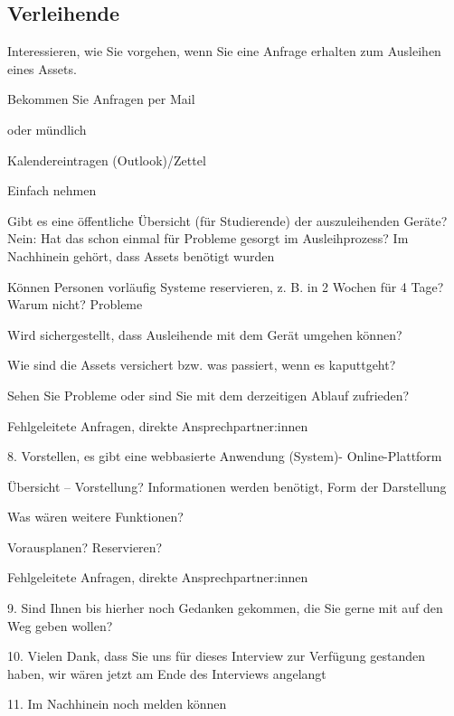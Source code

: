 \subsection{Verleihende}
{\sffamily\color{maincolor}{Abschnitt: Jetzt}}
\begin{compactenum}
    \item Interessieren, wie Sie vorgehen, wenn Sie eine Anfrage erhalten zum Ausleihen eines
          Assets.
          \begin{compactenum}
              \item Bekommen Sie Anfragen per Mail
              \item oder mündlich
              \item Kalendereintragen (Outlook)/Zettel
              \item Einfach nehmen
          \end{compactenum}
    \item Gibt es eine öffentliche Übersicht (für Studierende) der auszuleihenden Geräte? Nein: Hat
          das schon einmal für Probleme gesorgt im Ausleihprozess? Im Nachhinein gehört, dass Assets
          benötigt wurden
    \item Können Personen vorläufig Systeme reservieren, z. B. in 2 Wochen für 4 Tage?
          Warum nicht? Probleme
    \item Wird sichergestellt, dass Ausleihende mit dem Gerät umgehen können?
    \item Wie sind die Assets versichert bzw. was passiert, wenn es kaputtgeht?
    \item Sehen Sie Probleme oder sind Sie mit dem derzeitigen Ablauf zufrieden?
    \item Fehlgeleitete Anfragen, direkte Ansprechpartner:innen
\end{compactenum}

{\sffamily\color{maincolor}{Abschnitt: Visionen und Ziele}}
\begin{compactenum}
    \item[8.] Vorstellen, es gibt eine webbasierte Anwendung (System)- Online-Plattform
        \begin{compactenum}
            \item Übersicht – Vorstellung?
                  Informationen werden benötigt,
                  Form der Darstellung
            \item Was wären weitere Funktionen?
            \item Vorausplanen? Reservieren?
            \item Fehlgeleitete Anfragen, direkte Ansprechpartner:innen
        \end{compactenum}
    \item[9.] Sind Ihnen bis hierher noch Gedanken gekommen, die Sie gerne mit auf den Weg geben wollen?
    \item[10.] Vielen Dank, dass Sie uns für dieses Interview zur Verfügung gestanden haben, wir wären jetzt am Ende des Interviews angelangt
    \item[11.] Im Nachhinein noch melden können
\end{compactenum}

